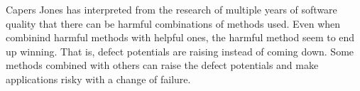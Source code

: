  


Capers Jones has interpreted from the research of multiple years of software quality that there can be harmful combinations of methods used. Even when combinind harmful methods with helpful ones, the harmful method seem to end up winning. That is, defect potentials are raising instead of coming down. Some methods combined with others can raise the defect potentials and make applications risky with a change of failure.
